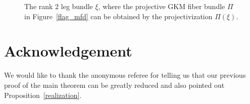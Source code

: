 \documentclass[12pt]{amsart}
\theoremstyle{definition}
\theoremstyle{remark}
\numberwithin{equation}{section}
\begin{document}
\begin{figure}[H]
\caption{The rank $2$ leg bundle $\xi$, where
the projective GKM fiber bundle $\Pi$ in Figure~\ref{flag_mfd} can be obtained by the projectivization $\Pi(\xi)$.}
\label{raional_leg_bundle}
\end{figure}




\section*{Acknowledgement}
We would like to thank the anonymous referee for telling us that our previous proof of the main theorem can be greatly reduced and also pointed out Proposition~\ref{realization}.



\end{document}
